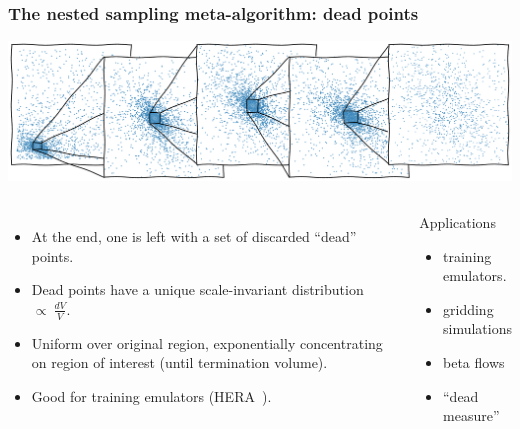 \documentclass[aspectratio=169]{beamer}
\begin{document}
\begin{frame}
    \frametitle{The nested sampling meta-algorithm: dead points}
    \includegraphics[width=\textwidth]{figures/dead_measure}
    \begin{columns}
        \begin{itemize}
            \item At the end, one is left with a set of discarded ``dead'' points.
            \item Dead points have a unique scale-invariant distribution $\propto\: \tfrac{dV}{V}$.
            \item Uniform over original region, exponentially concentrating on region of interest (until termination volume).
            \item Good for training emulators (HERA~).
        \end{itemize}
        \begin{block}{Applications}
        \begin{itemize}
            \item training emulators.
            \item gridding simulations
            \item beta flows
            \item ``dead measure'' 
        \end{itemize}
        \end{block}
    \end{columns}
\end{frame}
\end{document}
